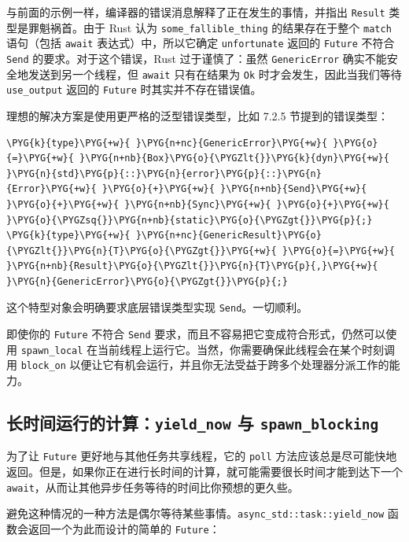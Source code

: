 与前面的示例一样，编译器的错误消息解释了正在发生的事情，并指出 \texttt{Result} 类型是罪魁祸首。由于 Rust 认为 \texttt{some\_fallible\_thing} 的结果存在于整个 \texttt{match} 语句（包括 \texttt{await} 表达式）中，所以它确定 \texttt{unfortunate} 返回的 \texttt{Future} 不符合 \texttt{Send} 的要求。对于这个错误，Rust 过于谨慎了：虽然 \texttt{GenericError} 确实不能安全地发送到另一个线程，但 \texttt{await} 只有在结果为 \texttt{Ok} 时才会发生，因此当我们等待 \texttt{use\_output} 返回的 \texttt{Future} 时其实并不存在错误值。

理想的解决方案是使用更严格的泛型错误类型，比如 7.2.5 节提到的错误类型：

\begin{Verbatim}[commandchars=\\\{\},breaklines=true,breakanywhere=true,fontsize=\codefont,xleftmargin=17bp]
\PYG{k}{type}\PYG{+w}{ }\PYG{n+nc}{GenericError}\PYG{+w}{ }\PYG{o}{=}\PYG{+w}{ }\PYG{n+nb}{Box}\PYG{o}{\PYGZlt{}}\PYG{k}{dyn}\PYG{+w}{ }\PYG{n}{std}\PYG{p}{::}\PYG{n}{error}\PYG{p}{::}\PYG{n}{Error}\PYG{+w}{ }\PYG{o}{+}\PYG{+w}{ }\PYG{n+nb}{Send}\PYG{+w}{ }\PYG{o}{+}\PYG{+w}{ }\PYG{n+nb}{Sync}\PYG{+w}{ }\PYG{o}{+}\PYG{+w}{ }\PYG{o}{\PYGZsq{}}\PYG{n+nb}{static}\PYG{o}{\PYGZgt{}}\PYG{p}{;}
\PYG{k}{type}\PYG{+w}{ }\PYG{n+nc}{GenericResult}\PYG{o}{\PYGZlt{}}\PYG{n}{T}\PYG{o}{\PYGZgt{}}\PYG{+w}{ }\PYG{o}{=}\PYG{+w}{ }\PYG{n+nb}{Result}\PYG{o}{\PYGZlt{}}\PYG{n}{T}\PYG{p}{,}\PYG{+w}{ }\PYG{n}{GenericError}\PYG{o}{\PYGZgt{}}\PYG{p}{;}
\end{Verbatim}

这个特型对象会明确要求底层错误类型实现 \texttt{Send}。一切顺利。

即使你的 \texttt{Future} 不符合 \texttt{Send} 要求，而且不容易把它变成符合形式，仍然可以使用 \texttt{spawn\_local} 在当前线程上运行它。当然，你需要确保此线程会在某个时刻调用 \texttt{block\_on} 以便让它有机会运行，并且你无法受益于跨多个处理器分派工作的能力。

\subsection{长时间运行的计算：\texttt{yield\_now} 与 \texttt{spawn\_blocking}}

为了让 \texttt{Future} 更好地与其他任务共享线程，它的 \texttt{poll} 方法应该总是尽可能快地返回。但是，如果你正在进行长时间的计算，就可能需要很长时间才能到达下一个 \texttt{await}，从而让其他异步任务等待的时间比你预想的更久些。

避免这种情况的一种方法是偶尔等待某些事情。\texttt{async\_std::task::yield\_now} 函数会返回一个为此而设计的简单的 \texttt{Future}：

